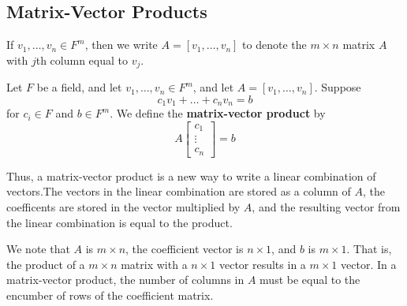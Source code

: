 \documentclass{article}
\begin{document}
\subsection{Matrix-Vector Products}
\begin{proposition}
  If $v_1, \ldots, v_n \in F^m$, then we write $A =[v_1, \ldots, v_n]$ to denote the $m \times n$ matrix $A$ with $j$th column equal to $v_j$.
\end{proposition}
\begin{definition}
  Let $F$ be a field, and let $v_1, \ldots, v_n \in F^m$, and let $A = [v_1, \ldots, v_n]$. Suppose \[
    c_1v_1 + \dots + c_nv_n = b
  \]
  for $c_i \in F$ and $b \in F^m$. We define the \textbf{matrix-vector product} by \[
    A
    \begin{bmatrix}
      c_1\\
      \vdots\\
      c_n
    \end{bmatrix}
    = b
  \]
\end{definition}
\begin{remark}
  Thus, a matrix-vector product is a new way to write a linear combination of vectors.The vectors in the linear combination are stored as a column of $A$, the coefficents are stored in the vector multiplied by $A$, and the resulting vector from the linear combination is equal to the product.

  We note that $A$ is $m \times n$, the coefficient vector is $n \times 1$, and $b$ is $m \times 1$. That is, the product of a $m \times n$ matrix with a $n \times 1$ vector results in a $m \times 1$ vector. In a matrix-vector product, the number of columns in $A$ must be equal to the encumber of rows of the coefficient matrix.
\end{remark}
\end{document}
